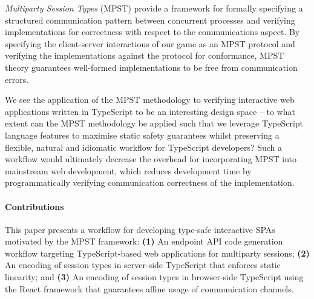 \textit{Multiparty Session Types} (MPST) \cite{MPST} provide a framework for
formally specifying a structured communication pattern between concurrent
processes and verifying implementations for correctness with respect to the
communications aspect.
By specifying the client-server interactions of our game as an MPST protocol
and verifying the implementations against the protocol for conformance,
MPST theory guarantees well-formed implementations to be free from
communication errors.

We see the application of the MPST methodology to verifying interactive web
applications written in TypeScript to be an interesting design space -- to what
extent can the MPST methodology be applied such that we leverage TypeScript
language features to maximise static safety guarantees whilst preserving a
flexible, natural and idiomatic workflow for TypeScript developers?
Such a workflow would ultimately decrease the overhead for incorporating MPST
into mainstream web development, which reduces development time by programmatically
verifying communication correctness of the implementation.

\paragraph{Contributions}
This paper presents a workflow for developing type-safe interactive SPAs
motivated by the MPST framework:
\textbf{(1)} An endpoint API code generation
workflow targeting TypeScript-based web applications for multiparty sessions;
\textbf{(2)} An encoding of session types in server-side TypeScript that
enforces static linearity;
and \textbf{(3)} An encoding of session types in
browser-side TypeScript using the React framework that guarantees affine usage
of communication channels.


